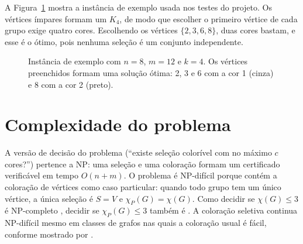 \documentclass[12pt]{article}
\newcommand{\chiP}{\chi_P}
\begin{document}
A Figura~\ref{fig:toy} mostra a instância de exemplo usada nos testes do
projeto. Os vértices ímpares formam um $K_4$, de modo que escolher o primeiro
vértice de cada grupo exige quatro cores. Escolhendo os vértices
$\{2,3,6,8\}$, duas cores bastam, e esse é o ótimo, pois nenhuma seleção é um
conjunto independente.

\begin{figure}[ht]
  \centering
  \caption{Instância de exemplo com $n=8$, $m=12$ e $k=4$. Os vértices
    preenchidos formam uma solução ótima: 2, 3 e 6 com a cor 1 (cinza) e 8 com
    a cor 2 (preto).}
  \label{fig:toy}
\end{figure}

\section{Complexidade do problema}\label{sec:complexidade}

A versão de decisão do problema (``existe seleção colorível com no máximo $c$
cores?'') pertence a NP: uma seleção e uma coloração formam um certificado
verificável em tempo $O(n+m)$. O problema é NP-difícil porque contém a coloração
de vértices como caso particular: quando todo grupo tem um único vértice, a
única seleção é $S=V$ e $\chiP(G)=\chi(G)$. Como decidir se $\chi(G)\le 3$ é
NP-completo \cite{karp1972,garey1979}, decidir se $\chiP(G)\le 3$ também é
\cite{li2000}. A coloração seletiva continua NP-difícil mesmo em classes de
grafos nas quais a coloração usual é fácil, conforme mostrado por
\cite{demange2014}.
\end{document}
